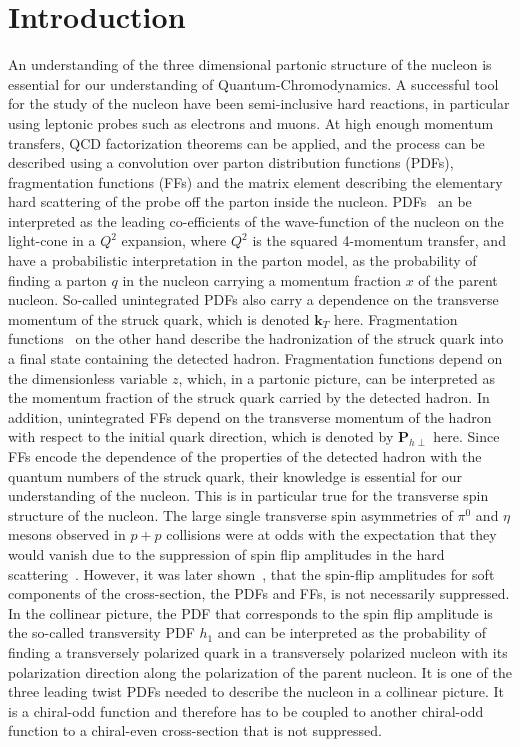 \documentclass[aps,prX,preprint,groupedaddress,linenumbers]{revtex4-1}
\begin{document}
\section{Introduction}
An understanding of the three dimensional partonic structure of the nucleon is essential for our understanding of Quantum-Chromodynamics. A successful tool for the study of the nucleon have been semi-inclusive hard reactions, in particular using leptonic probes such as electrons and muons. 
At high enough momentum transfers, QCD factorization theorems can be applied, and the process can be described using a convolution over parton distribution functions (PDFs), fragmentation functions (FFs) and the matrix element describing the elementary hard scattering of the probe off the parton inside the nucleon.
PDFs~\cite{Aidala:2012mv} an be interpreted as the leading co-efficients of the wave-function of the nucleon on the light-cone in a $Q^2$ expansion, where $Q^2$ is the squared 4-momentum transfer, and have a probabilistic interpretation in the parton model, as the probability of finding a parton $q$ in the nucleon carrying a momentum fraction $x$ of the parent nucleon. So-called unintegrated PDFs also carry a dependence on the transverse momentum of the struck quark, which is denoted $\boldsymbol{k}_T$ here. Fragmentation functions~\cite{Metz:2016swz} on the other hand describe the hadronization of the struck quark into a final state containing the detected hadron.
Fragmentation functions depend on the dimensionless variable $z$, which, in a partonic picture, can be interpreted as the momentum fraction of the struck quark carried by the detected hadron. In addition, unintegrated FFs depend on the transverse momentum of the hadron with respect to the initial quark direction, which is denoted by $\boldsymbol{P}_{h\perp}$ here. Since FFs encode the dependence of the properties of the detected hadron with the quantum numbers of the struck quark, their knowledge is essential for our understanding of the nucleon. This is in particular true for the transverse spin structure of the nucleon. The large single transverse spin asymmetries of $\pi^0$ and $\eta$ mesons observed in $p+p$ collisions were at odds with the expectation that they would vanish due to the suppression of spin flip amplitudes in the hard scattering~\cite{TSSA_old_theory}. However, it was later shown~\cite{TSSA_Collins}, that the spin-flip amplitudes for soft components of the cross-section, the PDFs and FFs, is not necessarily suppressed. 
In the collinear picture, the PDF that corresponds to the spin flip amplitude is the so-called transversity PDF $h_1$ and can be interpreted as the probability of finding a transversely polarized quark in a transversely polarized nucleon with its polarization direction along the polarization of the parent nucleon. It is one of the three leading twist PDFs needed to describe the nucleon in a collinear picture. It is a chiral-odd function and therefore has to be coupled to another chiral-odd function to a chiral-even cross-section that is not suppressed.
\end{document}
